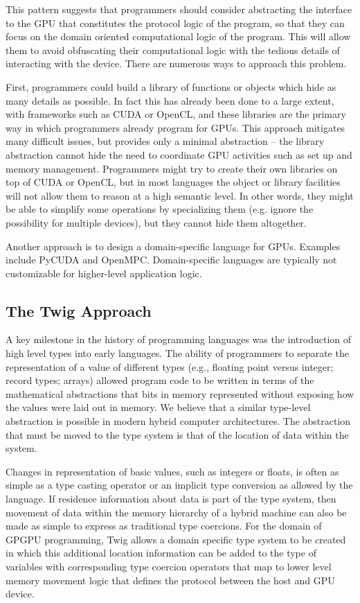 \documentclass{acm_proc_article-sp}
\begin{document}
This pattern suggests that programmers should consider abstracting the
interface to the GPU that constitutes the protocol logic of the program, so
that they can focus on the domain oriented computational logic of the program.
This will allow them to avoid obfuscating their computational logic with the
tedious details of interacting with the device. There are numerous ways to
approach this problem.

First, programmers could build a library of functions or objects which hide as
many details as possible. In fact this has already been done to a large
extent, with frameworks such as CUDA or OpenCL, and these libraries are the
primary way in which programmers already program for GPUs. This approach
mitigates many difficult issues, but provides only a minimal abstraction --
the library abstraction cannot hide the need to coordinate GPU activities such
as set up and memory management. Programmers might try to create their own
libraries on top of CUDA or OpenCL, but in most languages the object or
library facilities will not allow them to reason at a high semantic level. In
other words, they might be able to simplify some operations by specializing
them (e.g. ignore the possibility for multiple devices), but they cannot hide
them altogether.

Another approach is to design a domain-specific language for GPUs. Examples
include PyCUDA and OpenMPC. Domain-specific languages are typically not
customizable for higher-level application logic.

\subsection{The Twig Approach}


A key milestone in the history of programming languages was the introduction
of high level types into early languages. The ability of programmers to
separate the representation of a value of different types (e.g., floating
point versus integer; record types; arrays) allowed program code to be written
in terms of the mathematical abstractions that bits in memory represented
without exposing how the values were laid out in memory. We believe that a
similar type-level abstraction is possible in modern hybrid computer
architectures. The abstraction that must be moved to the type system is that
of the location of data within the system.

Changes in representation of basic values, such as integers or floats, is
often as simple as a type casting operator or an implicit type conversion as
allowed by the language. If residence information about data is part of the
type system, then movement of data within the memory hierarchy of a hybrid
machine can also be made as simple to express as traditional type coercions.
For the domain of GPGPU programming, Twig allows a domain specific type system
to be created in which this additional location information can be added to
the type of variables with corresponding type coercion operators that map to
lower level memory movement logic that defines the protocol between the host
and GPU device.
\end{document}
